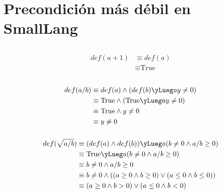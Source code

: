 \documentclass[fleqn,10pt,a4paper]{article}
\begin{document}
\maketitletxtlogo
\newpage

\tableofcontents
\newpage

\section{Precondición más débil en SmallLang}
\subsection{}%
\subsubsection{}%

\begin{align*}
def(a + 1) &\equiv def(a)\\
           &\equiv \text{True} \\
\end{align*}
\subsubsection{}%

\begin{align*}
def(a / b) &\equiv def(a) \land (def(b) \yLuego y \neq 0)\\
           &\equiv \text{True} \land (\text{True} \yLuego y \neq 0) \\
           &\equiv \text{True} \land y \neq 0 \\
           &\equiv y \neq 0
\end{align*}

\subsubsection{}%

\begin{align*}
def(\sqrt{a/b}) &\equiv (def(a) \land def(b)) \yLuego (b \neq 0 \land a/b \geq 0) \\
                &\equiv \text{True} \yLuego (b \neq 0 \land a/b \geq 0) \\
                &\equiv b \neq 0 \land a/b \geq 0 \\
                &\equiv b \neq 0 \land ((a \geq 0 \land b \geq 0) \lor (a \leq 0 \land b \leq 0)) \\
                &\equiv (a \geq 0 \land b > 0) \lor (a \leq 0 \land b < 0)
\end{align*}
\end{document}
